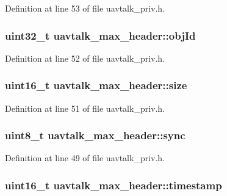 \-Definition at line 53 of file uavtalk\-\_\-priv.\-h.

\hypertarget{structuavtalk__max__header_ae86ac377823746b4ec927b0bf9d7d79b}{
\subsubsection[{obj\-Id}]{\setlength{\rightskip}{0pt plus 5cm}uint32\-\_\-t {\bf uavtalk\-\_\-max\-\_\-header\-::obj\-Id}}}\label{structuavtalk__max__header_ae86ac377823746b4ec927b0bf9d7d79b}


\-Definition at line 52 of file uavtalk\-\_\-priv.\-h.

\hypertarget{structuavtalk__max__header_a8c446383de21042da34e0f6e2900772a}{
\subsubsection[{size}]{\setlength{\rightskip}{0pt plus 5cm}uint16\-\_\-t {\bf uavtalk\-\_\-max\-\_\-header\-::size}}}\label{structuavtalk__max__header_a8c446383de21042da34e0f6e2900772a}


\-Definition at line 51 of file uavtalk\-\_\-priv.\-h.

\hypertarget{structuavtalk__max__header_a345956ffa399c59404b4e1523001759a}{
\subsubsection[{sync}]{\setlength{\rightskip}{0pt plus 5cm}uint8\-\_\-t {\bf uavtalk\-\_\-max\-\_\-header\-::sync}}}\label{structuavtalk__max__header_a345956ffa399c59404b4e1523001759a}


\-Definition at line 49 of file uavtalk\-\_\-priv.\-h.

\hypertarget{structuavtalk__max__header_a9dcfa0653337ea23ff5de9ba704d8db7}{
\subsubsection[{timestamp}]{\setlength{\rightskip}{0pt plus 5cm}uint16\-\_\-t {\bf uavtalk\-\_\-max\-\_\-header\-::timestamp}}}\label{structuavtalk__max__header_a9dcfa0653337ea23ff5de9ba704d8db7}


